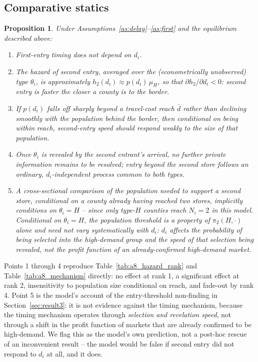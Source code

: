\documentclass[12pt]{article}
\newtheorem{proposition}{Proposition}
\begin{document}
\subsection{Comparative statics}

\begin{proposition}
\label{prop:main}
Under Assumptions~\ref{as:delay}--\ref{as:first} and the equilibrium described above:
\begin{enumerate}
  \item First-entry timing does not depend on $d_i$.
  \item The hazard of second entry, averaged over the (econometrically unobserved) type $\theta_i$, is
        approximately $h_2(d_i) \approx p(d_i)\,\mu_H$, so that $\partial h_2/\partial d_i < 0$: second entry
        is faster the closer a county is to the border.
  \item If $p(d_i)$ falls off sharply beyond a travel-cost reach $\bar{d}$ rather than declining smoothly
        with the population behind the border, then conditional on being within reach, second-entry speed
        should respond weakly to the \emph{size} of that population.
  \item Once $\theta_i$ is revealed by the second entrant's arrival, no further private information remains
        to be resolved; entry beyond the second store follows an ordinary, $d_i$-independent process common
        to both types.
  \item A cross-sectional comparison of the population needed to support a second store, conditional on a
        county already having reached two stores, implicitly conditions on $\theta_i = H$ -- since only
        type-$H$ counties reach $N_i=2$ in this model. Conditional on $\theta_i=H$, the population threshold
        is a property of $\pi_2(H, \cdot)$ alone and need not vary systematically with $d_i$: $d_i$ affects
        the \emph{probability} of being selected into the high-demand group and the \emph{speed} of that
        selection being revealed, not the profit function of an already-confirmed high-demand market.
\end{enumerate}
\end{proposition}

Points 1 through 4 reproduce Table~\ref{tab:a8_hazard_rank} and Table~\ref{tab:a8_mechanism} directly: no
effect at rank 1, a significant effect at rank 2, insensitivity to population size conditional on reach, and
fade-out by rank 4. Point 5 is the model's account of the entry-threshold non-finding in
Section~\ref{sec:result3}: it is not evidence against the timing mechanism, because the timing mechanism
operates through \emph{selection and revelation speed}, not through a shift in the profit function of markets
that are already confirmed to be high-demand. We flag this as the model's own prediction, not a
post-hoc rescue of an inconvenient result -- the model would be false if second entry did not respond to
$d_i$ at all, and it does.
\end{document}
